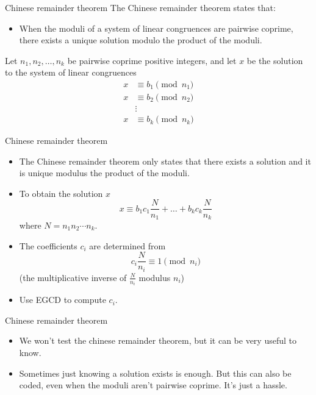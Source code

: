 \documentclass{beamer}
\begin{document}
\begin{frame}[plain]{Chinese remainder theorem}
  \vspace{20pt}
  The Chinese remainder theorem states that:
  \begin{itemize}
    \item When the moduli of a system of linear congruences are pairwise
      coprime, there exists a unique solution modulo the product of the moduli.
  \end{itemize}
  Let $n_1, n_2,\ldots, n_k$ be pairwise coprime positive integers, and let $x$
  be the solution to the system of linear congruences
  \begin{align*}
    x &\equiv  b_1 \pmod{n_1} \\
    x &\equiv  b_2 \pmod{n_2} \\
      &\vdots                 \\
    x &\equiv b_k \pmod{n_k}
  \end{align*}
\end{frame}

\begin{frame}[plain]{Chinese remainder theorem}
  \vspace{10pt}
  \begin{itemize}
    \item The Chinese remainder theorem only states that there exists a solution and it
  is unique modulus the product of the moduli. \\
    \item To obtain the solution $x$
      \[
        x \equiv b_1 c_1 \frac{N}{n_1} + \ldots + b_k c_k \frac{N}{n_k}
      \]
      where $N = n_1 n_2 \cdots n_k$.
    \item The coefficients $c_i$ are determined from
      \[
        c_i \frac{N}{n_i} \equiv 1 \pmod{n_i}
      \]
      (the multiplicative inverse of $\frac{N}{n_i}$ modulus $n_i$)
    \item Use EGCD to compute $c_i$.
  \end{itemize}
\end{frame}

\begin{frame}[plain]{Chinese remainder theorem}
  \vspace{10pt}
  \begin{itemize}
    \item We won't test the chinese remainder theorem, but it can be very useful to know.
    
    \item Sometimes just knowing a solution exists is enough. But this can also be coded, even when the moduli aren't pairwise coprime. It's just a hassle.
  \end{itemize}
\end{frame}
\end{document}

